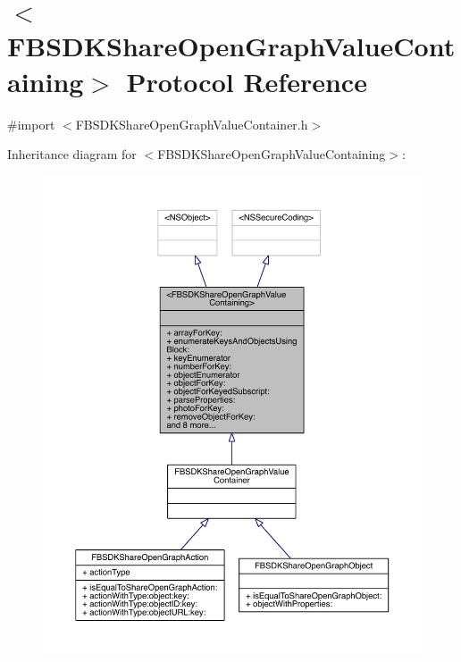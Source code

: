 \hypertarget{protocol_f_b_s_d_k_share_open_graph_value_containing-p}{\section{$<$F\-B\-S\-D\-K\-Share\-Open\-Graph\-Value\-Containing$>$ Protocol Reference}
\label{protocol_f_b_s_d_k_share_open_graph_value_containing-p}
}


{\ttfamily \#import $<$F\-B\-S\-D\-K\-Share\-Open\-Graph\-Value\-Container.\-h$>$}



Inheritance diagram for $<$F\-B\-S\-D\-K\-Share\-Open\-Graph\-Value\-Containing$>$\-:
\nopagebreak
\begin{figure}[H]
\begin{center}
\leavevmode
\includegraphics[width=350pt]{protocol_f_b_s_d_k_share_open_graph_value_containing-p__inherit__graph}
\end{center}
\end{figure}


